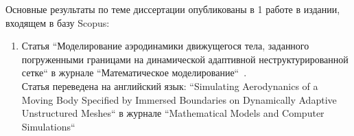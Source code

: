 {\publications} Основные результаты по теме диссертации опубликованы в 1 работе в издании, входящем в базу Scopus:
\begin{enumerate}
	\item Статья ``Моделирование аэродинамики движущегося тела, заданного погруженными границами на динамической адаптивной неструктурированной сетке`` в журнале ``Математическое моделирование``~\citeauthor{abalakin2018russian}.\\
	Статья переведена на английский язык: ``Simulating Aerodynanics of a Moving Body Specified by Immersed Boundaries on Dynamically Adaptive Unstructured Meshes`` в журнале ``Mathematical Models and Computer Simulations``~\citeauthor{abalakin2019simulating}
\end{enumerate}
